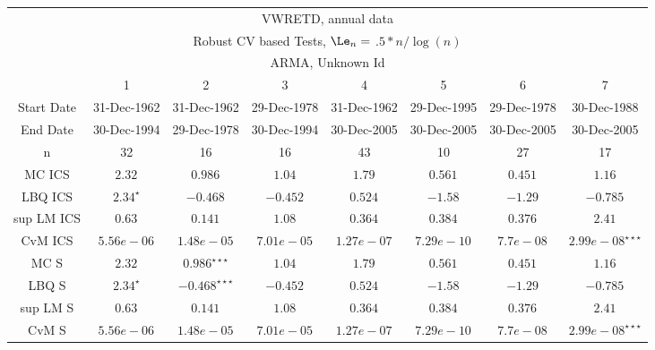  \begin{table}[H] 
 \tiny 
 \centering 
\begin{tabular}{|c|c|c|c|c|c|c|c|} 
\multicolumn{8}{c}{ VWRETD, annual data } \\ 
\multicolumn{8}{c}{ Robust CV based Tests, $\Le_n =$ $.5*n/\log(n)$ } \\ 
\multicolumn{8}{c}{ ARMA, Unknown Id } \\ 
 \hline 
 &  1  &  2  &  3  &  4  &  5  &  6  &  7    \\ 
 Start Date &  31-Dec-1962 &  31-Dec-1962 &  29-Dec-1978 &  31-Dec-1962 &  29-Dec-1995 &  29-Dec-1978 &  30-Dec-1988 \\ 
 End Date &  30-Dec-1994 &  29-Dec-1978 &  30-Dec-1994 &  30-Dec-2005 &  30-Dec-2005 &  30-Dec-2005 &  30-Dec-2005 \\ 
 n &   32  &   16  &   16  &   43  &   10  &   27  &   17  \\ 
 \hline 
 MC ICS &   $ 2.32^{} $  &   $ 0.986^{} $  &   $ 1.04^{} $  &   $ 1.79^{} $  &   $ 0.561^{} $  &   $ 0.451^{} $  &   $ 1.16^{} $  \\ 
 LBQ ICS &   $ 2.34^{\star } $  &   $ -0.468^{} $  &   $ -0.452^{} $  &   $ 0.524^{} $  &   $ -1.58^{} $  &   $ -1.29^{} $  &   $ -0.785^{} $  \\ 
 sup LM ICS &   $ 0.63^{} $  &   $ 0.141^{} $  &   $ 1.08^{} $  &   $ 0.364^{} $  &   $ 0.384^{} $  &   $ 0.376^{} $  &   $ 2.41^{} $  \\ 
 CvM ICS &   $ 5.56e-06^{} $  &   $ 1.48e-05^{} $  &   $ 7.01e-05^{} $  &   $ 1.27e-07^{} $  &   $ 7.29e-10^{} $  &   $ 7.7e-08^{} $  &   $ 2.99e-08^{\star \star \star } $  \\ 
 \hline 
 MC S &   $ 2.32^{} $  &   $ 0.986^{\star \star \star } $  &   $ 1.04^{} $  &   $ 1.79^{} $  &   $ 0.561^{} $  &   $ 0.451^{} $  &   $ 1.16^{} $  \\ 
 LBQ S &   $ 2.34^{\star } $  &   $ -0.468^{\star \star \star } $  &   $ -0.452^{} $  &   $ 0.524^{} $  &   $ -1.58^{} $  &   $ -1.29^{} $  &   $ -0.785^{} $  \\ 
 sup LM S &   $ 0.63^{} $  &   $ 0.141^{} $  &   $ 1.08^{} $  &   $ 0.364^{} $  &   $ 0.384^{} $  &   $ 0.376^{} $  &   $ 2.41^{} $  \\ 
 CvM S &   $ 5.56e-06^{} $  &   $ 1.48e-05^{} $  &   $ 7.01e-05^{} $  &   $ 1.27e-07^{} $  &   $ 7.29e-10^{} $  &   $ 7.7e-08^{} $  &   $ 2.99e-08^{\star \star \star } $  \\ 
 \hline 
\end{tabular}
 \end{table}

